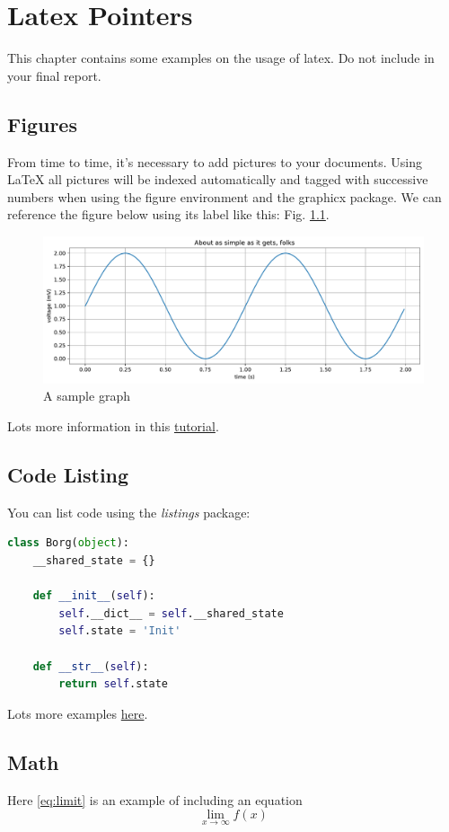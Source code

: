 \chapter{Latex Pointers}

This chapter contains some examples on the usage of latex. Do not include in your final report.

\section{Figures}
From time to time, it's necessary to add pictures to your documents. Using LaTeX all pictures will be indexed automatically and tagged with successive numbers when using the figure environment and the graphicx package. We can reference the figure below using its label like this: Fig. \ref{fig:test_plot}.
\begin{figure}[h]
    \centering
  \includegraphics[width=0.8\linewidth]{./assets/images/test-plot.pdf}
  \caption{A sample graph}
  \label{fig:test_plot}
\end{figure}

Lots more information in this \href{https://www.latex-tutorial.com/tutorials/figures/}{tutorial}.


\section{Code Listing}
You can list code using the \emph{listings} package:

\begin{lstlisting}[language=Python,caption=Borg Pattern]
class Borg(object):
    __shared_state = {}

    def __init__(self):
        self.__dict__ = self.__shared_state
        self.state = 'Init'

    def __str__(self):
        return self.state
\end{lstlisting}

Lots more examples \href{https://www.overleaf.com/learn/latex/Code_listing}{here}.

\section{Math}
Here \ref{eq:limit} is an example of including an equation
\begin{equation}
\lim_{x\to\infty} f(x)
\label{eq:limit}
\end{equation}

